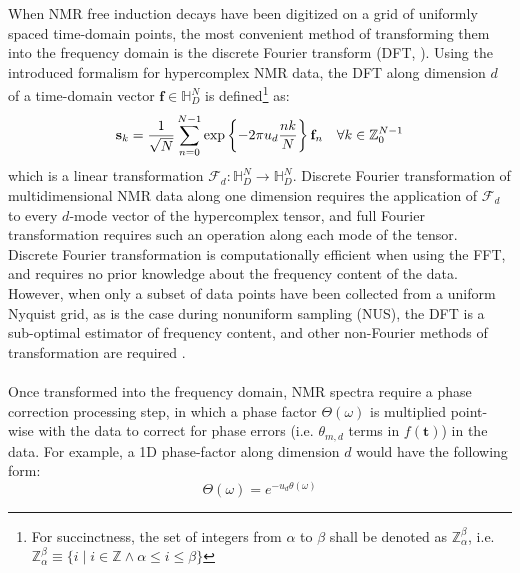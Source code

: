 \begin{doublespace}
When NMR free induction decays have been digitized on a grid of uniformly
spaced time-domain points, the most convenient method of transforming them
into the frequency domain is the discrete Fourier transform (DFT,
\cite{bretthorst:cmr2008,schuyler:jmr2013}). Using the introduced formalism for
hypercomplex NMR data, the DFT along dimension $d$ of a time-domain vector
$\mathbf{f} \in \mathbb{H}_D^N$ is defined\footnote{
  For succinctness, the set of integers from $\alpha$ to $\beta$
  shall be denoted as $\mathbb{Z}_\alpha^\beta$, i.e.
  $\mathbb{Z}_\alpha^\beta \equiv \{
   i \mid i \in \mathbb{Z} \wedge \alpha \le i \le \beta
   \}$
} as:
\begin{equation}
\mathbf{s}_k = \frac{1}{\sqrt{N}} \sum_{n=0}^{N-1}
  \exp\left\{ -2 \pi u_d \frac{n k}{N} \right\}
  \mathbf{f}_n
  \quad \forall k \in \mathbb{Z}_{0}^{N-1}
\end{equation}
which is a linear transformation
$\mathcal{F}_d : \mathbb{H}_D^N \to \mathbb{H}_D^N$. Discrete Fourier
transformation of multidimensional NMR data along one dimension requires the
application of $\mathcal{F}_d$ to every $d$-mode vector of the hypercomplex
tensor, and full Fourier transformation requires such an operation along each
mode of the tensor. Discrete Fourier transformation is computationally
efficient when using the FFT, and requires no prior knowledge about the
frequency content of the data. However, when only a subset of data points
have been collected from a uniform Nyquist grid, as is the case during
nonuniform sampling (NUS), the DFT is a sub-optimal estimator of frequency
content, and other non-Fourier methods of transformation are required
\cite{bretthorst:cmr2008,mobli:pnmrs2014}.
\\\\
Once transformed into the frequency domain, NMR spectra require a phase
correction processing step, in which a phase factor $\Theta(\omega)$ is
multiplied point-wise with the data to correct for phase errors
(i.e. $\theta_{m,d}$ terms in $f(\mathbf{t})$) in the data. For example, a
1D phase-factor along dimension $d$ would have the following form:
\begin{equation}
\Theta(\omega) = e^{ -u_d \theta(\omega) }
\end{equation}


\end{doublespace}

